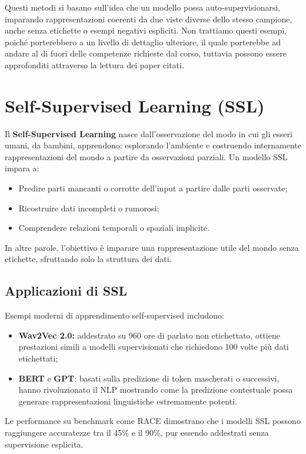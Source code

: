 Questi metodi si basano sull’idea che un modello possa auto-supervisionarsi, imparando rappresentazioni coerenti da due viste diverse dello stesso campione, anche senza etichette o esempi negativi espliciti. Non trattiamo questi esempi, poiché porterebbero a un livello di dettaglio ulteriore, il quale porterebbe ad andare al di fuori delle competenze richieste dal corso, tuttavia possono essere approfonditi attraverso la lettura dei paper citati.

\section{Self-Supervised Learning (SSL)}
Il \textbf{Self-Supervised Learning} nasce dall’osservazione del modo in cui gli esseri umani, da bambini, apprendono: esplorando l’ambiente e costruendo internamente rappresentazioni del mondo a partire da osservazioni parziali. Un modello SSL impara a:
\begin{itemize}
    \item Predire parti mancanti o corrotte dell’input a partire dalle parti osservate;
    \item Ricostruire dati incompleti o rumorosi;
    \item Comprendere relazioni temporali o spaziali implicite.
\end{itemize}

In altre parole, l’obiettivo è imparare una rappresentazione utile del mondo senza etichette, sfruttando solo la struttura dei dati.

\subsection{Applicazioni di SSL}
Esempi moderni di apprendimento self-supervised includono:
\begin{itemize}
    \item \textbf{Wav2Vec 2.0:} addestrato su 960 ore di parlato non etichettato, ottiene prestazioni simili a modelli supervisionati che richiedono 100 volte più dati etichettati;
    \item \textbf{BERT} e \textbf{GPT}: basati sulla predizione di token mascherati o successivi, hanno rivoluzionato il NLP mostrando come la predizione contestuale possa generare rappresentazioni linguistiche estremamente potenti.
\end{itemize}

Le performance su benchmark come RACE dimostrano che i modelli SSL possono raggiungere accuratezze tra il 45\% e il 90\%, pur essendo addestrati senza supervisione esplicita.
